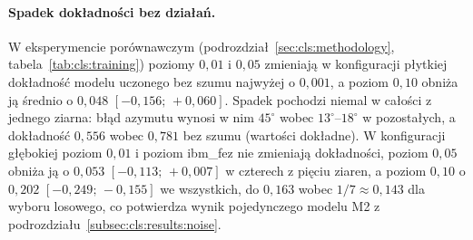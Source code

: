 \paragraph{Spadek dokładności bez działań.}
W eksperymencie porównawczym (podrozdział~\ref{sec:cls:methodology}, tabela~\ref{tab:cls:training}) poziomy $0{,}01$ i $0{,}05$ zmieniają w konfiguracji płytkiej dokładność modelu uczonego bez szumu najwyżej o $0{,}001$, a poziom $0{,}10$ obniża ją średnio o $0{,}048$ $[-0{,}156;\,+0{,}060]$.
Spadek pochodzi niemal w całości z jednego ziarna: błąd azymutu wynosi w nim $45^{\circ}$ wobec $13^{\circ}$--$18^{\circ}$ w pozostałych, a dokładność $0{,}556$ wobec $0{,}781$ bez szumu (wartości dokładne).
W konfiguracji głębokiej poziom $0{,}01$ i poziom ibm\_fez nie zmieniają dokładności, poziom $0{,}05$ obniża ją o $0{,}053$ $[-0{,}113;\,+0{,}007]$ w czterech z pięciu ziaren, a poziom $0{,}10$ o $0{,}202$ $[-0{,}249;\,-0{,}155]$ we wszystkich, do $0{,}163$ wobec $1/7\approx 0{,}143$ dla wyboru losowego, co potwierdza wynik pojedynczego modelu M2 z podrozdziału~\ref{subsec:cls:results:noise}.

